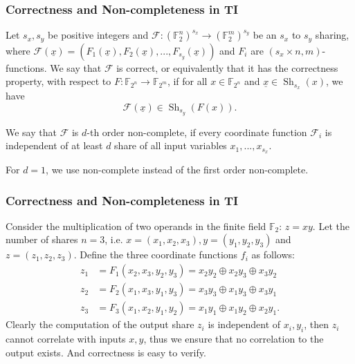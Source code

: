 \documentclass[
    aspectratio=169,                   %
]{beamer}
\newcommand{\F}{\mathbb{F}}
\begin{document}
    \begin{frame}
        \frametitle{Correctness and Non-completeness in TI}
        \begin{definition}[Correctness]
            Let $ s_x,s_y $ be positive integers and $ \mathcal{F}:(\F_2^n)^{s_x}\rightarrow(\F_2^m)^{s_y} $ be an $ s_x $ to $ s_y $ sharing, where $ \mathcal{F}(\underline{x})=\left( F_1(\underline{x}),F_2(\underline{x}),...,F_{s_y}(\underline{x}) \right) $ 
            and $ F_i $ are $ (s_x\times n,m) $-functions.
            We say that $ \mathcal{F} $ is correct, or equivalently that it has the correctness property, 
            with respect to $ F:\F_{2^n}\rightarrow\F_{2^m} $, if for all $ x\in\F_{2^n} $ and $ \underline{x}\in\operatorname{Sh}_{s_x}(x) $, 
            we have 
            \[\mathcal{F}(\underline{x})\in\operatorname{Sh}_{s_y}(F(x)).\]
        \end{definition}
        \begin{definition}
            We say that $ \mathcal{F} $ is $ d $-th order non-complete, if every coordinate function $ \mathcal{F}_i $ is independent of at least $ d $ share of all input variables $ x_1,...,x_{s_x} $. 
        \end{definition}
        For $ d=1 $, we use non-complete instead of the first order non-complete. 
    
    \end{frame}
    \begin{frame}
        \frametitle{Correctness and Non-completeness in TI}
        
        \begin{example}
            Consider the multiplication of two operands in the finite field $ \F_2 $: $ z=xy $. 
            Let the number of shares $ n = 3 $, i.e. $ x=(x_1,x_2,x_3),y=(y_1,y_2,y_3) $ and $ z=(z_1,z_2,z_3) $. 
            Define the three coordinate functions $ f_i $ as follows:
            \begin{align*}
                 z_1&=F_1\left(x_2, x_3, y_2, y_3\right)=x_2 y_2 \oplus x_2 y_3 \oplus x_3 y_2 \\
                 z_2&=F_2\left(x_1, x_3, y_1, y_3\right)=x_3 y_3 \oplus x_1 y_3 \oplus x_3 y_1 \\
                 z_3&=F_3\left(x_1, x_2, y_1, y_2\right)=x_1 y_1 \oplus x_1 y_2 \oplus x_2 y_1.
            \end{align*}
            Clearly the computation of the output share $ z_i $ is independent of $ x_i,y_i $, 
            then $ z_i $ cannot correlate with inputs $ x,y $, thus we ensure that no correlation to the output exists. 
            And correctness is easy to verify. 
        \end{example}
    \end{frame}
    
\end{document}
